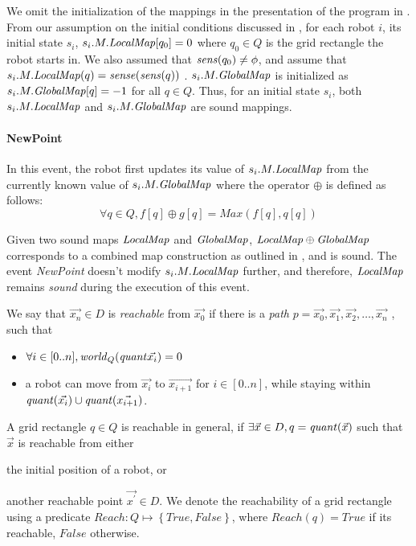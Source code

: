 We omit the initialization of the mappings in the presentation of the program in . From our assumption on the initial conditions discussed in , for each robot $i$, its initial state $s_i$, $s_i.M.\mathit{LocalMap}[q_0] = 0$ where $q_0\in Q$ is the grid rectangle the robot starts in. We also assumed that $\mathit{sens}(q_0)\neq \phi$, and assume that $s_i.M.\mathit{LocalMap}(q) = \mathit{sense}(\mathit{sens}(q))$ . $s_i.M.\mathit{GlobalMap}$ is initialized as $s_i.M.\mathit{GlobalMap}[q] = -1$ for all $q\in Q$. Thus, for an initial state $s_i$, both $s_i.M.\mathit{LocalMap}$ and $s_i.M.\mathit{GlobalMap}$ are sound mappings.

\paragraph{NewPoint}
In this event, the robot first updates its value of $s_i.M.\mathit{LocalMap}$ from the currently known value of $s_i.M.\mathit{GlobalMap}$ where the operator $\oplus$ is defined as follows:
$$\forall q \in Q, f[q] \oplus g[q] = \mathit{Max}(f[q], q[q])$$

Given two sound maps $\mathit{LocalMap}$ and $\mathit{GlobalMap}$, $\mathit{LocalMap} \oplus \mathit{GlobalMap}$ corresponds to a combined map construction as outlined in , and is sound. The event \emph{NewPoint} doesn't modify $s_i.M.\mathit{LocalMap}$ further, and therefore, $\mathit{LocalMap}$ remains \emph{sound} during the execution of this event.

\begin{definition}
    We say that $\Vec{x_n}\in D$ is \emph{reachable} from $\Vec{x_0}$ if there is a \emph{path} $p = \Vec{x_0},\Vec{x_1}, \Vec{x_2},\ldots, \Vec{x_n}$ , such that
    \begin{itemize}
        \item $\forall i \in [0..n],\mathit{world}_Q(\mathit{quant}{\Vec{x_i}}) = 0$
        \item a robot can move from $\Vec{x_i}$ to $\Vec{x_{i+1}}$ for $i \in [0..n]$, while staying within $\mathit{quant}(\Vec{x_i}) \cup \mathit{quant}(\Vec{x_{i+1}})$.
    \end{itemize}
\end{definition}

A grid rectangle $q\in Q$ is reachable in general, if $\exists \Vec{x}\in D, q = \mathit{quant}(\Vec{x})$ such that $\Vec{x}$ is reachable from either \begin{inparaenum} [(a)]
                                                                                                                                                   \item the initial position of a robot, or \item another reachable point $\Vec{x^\prime}\in D$. We denote the reachability of a grid rectangle using a predicate $\mathit{Reach} : Q \mapsto \left\{\mathit{True}, \mathit{False}\right\}$, where $\mathit{Reach}(q) = \mathit{True}$ if its reachable,  $\mathit{False}$ otherwise.
\end{inparaenum}

